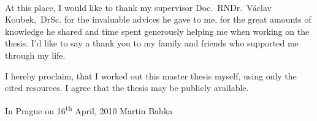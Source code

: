 \normalsize
\setcounter{page}{2}
\ \vspace{10mm} 

\noindent At this place, I would like to thank my supervisor Doc.~RNDr.~Václav Koubek,~DrSc. for the invaluable advices he gave to me, for the great amounts of knowledge he shared and time spent generously helping me when working on the thesis. I'd like to say a thank you to my family and friends who supported me through my life.

\vspace{\fill}
\noindent I hereby proclaim, that I worked out this master thesis myself, using only the cited resources. I agree that the thesis may be publicly available.

\bigskip
\noindent In Prague on 16\textsuperscript{th} April, 2010 \hspace{\fill}Martin Babka

\tableofcontents 

\newpage 

